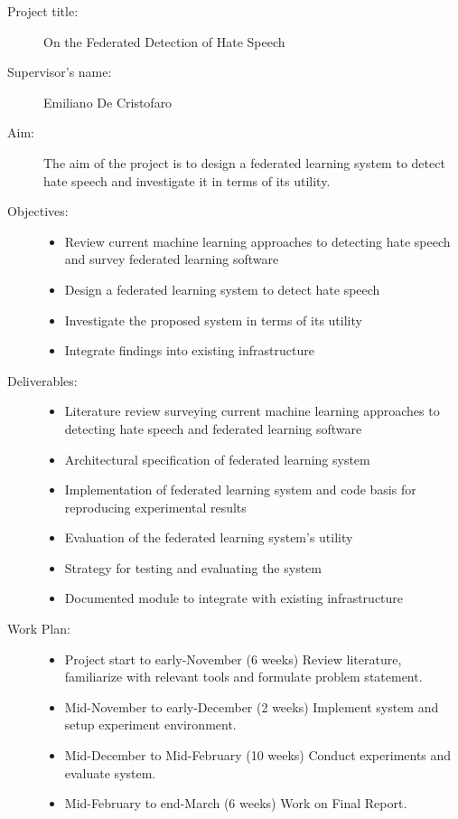\documentclass[12pt,leqno]{report}
\begin{document}
\begin{description}
\item[Project title:] On the Federated Detection of Hate Speech

\item[Supervisor’s name:] Emiliano De Cristofaro

\item[Aim:] The aim of the project is to design a federated learning system to detect hate speech and investigate it in terms of its utility.

\item[Objectives:] \hfill
\begin{itemize}
\item Review current machine learning approaches to detecting hate speech and survey federated learning software
\item Design a federated learning system to detect hate speech
\item Investigate the proposed system in terms of its utility
\item Integrate findings into existing infrastructure
\end{itemize}
\item[Deliverables:] \hfill
\begin{itemize}
\item Literature review surveying current machine learning approaches to detecting hate speech and federated learning software
\item Architectural specification of federated learning system
\item Implementation of federated learning system and code basis for reproducing experimental results
\item Evaluation of the federated learning system’s utility
\item Strategy for testing and evaluating the system
\item Documented module to integrate with existing infrastructure
\end{itemize}
\item[Work Plan:] \hfill
\begin{itemize}
\item Project start to early-November (6 weeks) Review literature, familiarize with relevant tools and formulate problem statement.

\item Mid-November to early-December (2 weeks) Implement system and setup experiment environment.

\item Mid-December to Mid-February (10 weeks) Conduct experiments and evaluate system.

\item Mid-February to end-March (6 weeks) Work on Final Report.
\end{itemize}
\end{description}
\end{document}
